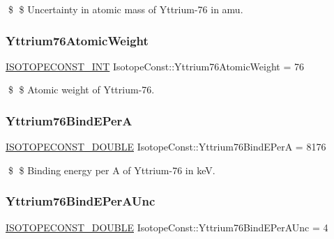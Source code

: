 \$ \$ Uncertainty in atomic mass of Yttrium-\/76 in amu. \mbox{\label{group___isotope_const-_yttrium-_y76_gaa10c2201465fd8f8130b67167491244c}} 
\subsubsection{\texorpdfstring{Yttrium76\+Atomic\+Weight}{Yttrium76AtomicWeight}}
{\footnotesize\ttfamily \mbox{\hyperlink{group___isotope_const-_macros_ga5f18360b3e99483a35c32d789e62621c}{I\+S\+O\+T\+O\+P\+E\+C\+O\+N\+S\+T\+\_\+\+I\+NT}} Isotope\+Const\+::\+Yttrium76\+Atomic\+Weight = 76}

\$ \$ Atomic weight of Yttrium-\/76. \mbox{\label{group___isotope_const-_yttrium-_y76_ga98dd10ea5ed0631697b21dc17079f53f}} 
\subsubsection{\texorpdfstring{Yttrium76\+Bind\+E\+PerA}{Yttrium76BindEPerA}}
{\footnotesize\ttfamily \mbox{\hyperlink{group___isotope_const-_macros_ga8f45a7272ce02c0b4c65c44636ed719a}{I\+S\+O\+T\+O\+P\+E\+C\+O\+N\+S\+T\+\_\+\+D\+O\+U\+B\+LE}} Isotope\+Const\+::\+Yttrium76\+Bind\+E\+PerA = 8176}

\$ \$ Binding energy per A of Yttrium-\/76 in keV. \mbox{\label{group___isotope_const-_yttrium-_y76_ga7cf87ce46ace338c1645baeabe9cce7d}} 
\subsubsection{\texorpdfstring{Yttrium76\+Bind\+E\+Per\+A\+Unc}{Yttrium76BindEPerAUnc}}
{\footnotesize\ttfamily \mbox{\hyperlink{group___isotope_const-_macros_ga8f45a7272ce02c0b4c65c44636ed719a}{I\+S\+O\+T\+O\+P\+E\+C\+O\+N\+S\+T\+\_\+\+D\+O\+U\+B\+LE}} Isotope\+Const\+::\+Yttrium76\+Bind\+E\+Per\+A\+Unc = 4}

